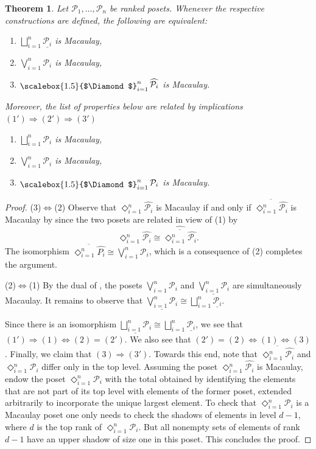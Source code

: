 \documentclass[11pt, reqno]{amsart}
\renewcommand{\P}{{\mathcal P}}
\theoremstyle{plain} %
\newtheorem{thm}{Theorem}[section]
\theoremstyle{definition}
\theoremstyle{remark}
\numberwithin{equation}{section}  %
\DeclareMathOperator{\dia}{\raisebox{-2pt}{\scalebox{1.5}{$\Diamond$}}}
\begin{document}
\begin{thm}
    \label{prop:equiv union wedge diamond}
Let $\P_1, \ldots, \P_n$ be ranked posets.   
 Whenever the respective constructions are defined, the following are equivalent:
\begin{enumerate}[itemsep=1mm]
    \item $\bigsqcup_{i=1}^n \underline{\P_i}$ is Macaulay, \
    \item $\bigvee_{i=1}^n \P_i$ is Macaulay, \
    \item $\dia_{i=1}^n \widehat{\P_i}$ is Macaulay.
\end{enumerate}
Moreover, the list of properties below are related by implications $(1')\Rightarrow (2')\Rightarrow (3')$
\begin{enumerate}
    \item[(1')] $\bigsqcup_{i=1}^n \P_i$ is Macaulay,
    \item[(2')] $\bigvee_{i=1}^n \P_i$ is Macaulay,
    \item[(3')] $\dia_{i=1}^n \P_i$ is Macaulay.
\end{enumerate}

\end{thm}
\begin{proof}
(3)$\Leftrightarrow$(2) Observe that $\Diamond_{i=1}^n \widehat{\P_i}$ is Macaulay if and only if  $\overline{\Diamond_{i=1}^n \widehat{\P_i}}$ is Macaulay by  since the two posets are related in view of  (1) by
\[
\Diamond_{i=1}^n \widehat{\P_i}\cong \widehat{\overline{\Diamond_{i=1}^n \widehat{\P_i}}}.
\] The isomorphism $\overline{\Diamond_{i=1}^n \widehat{P_i}} \cong \bigvee_{i=1}^n \P_i$, which is a consequence of  (2) completes the argument.

(2)$\Leftrightarrow$(1) By the dual of \Cref{prop: hat preserves Macaulay}, the posets $\bigvee_{i=1}^n \P_i$  and $\underline{\bigvee_{i=1}^n \P_i}$ are simultaneously  Macaulay.
It remains to observe that $\underline{\bigvee_{i=1}^n \P_i} \cong \bigsqcup_{i=1}^n \underline{\P_i}$.

Since there is an isomorphism $\underline{\bigsqcup_{i=1}^n \P_i}\cong  \bigsqcup_{i=1}^n \underline{\P_i}$, we see that $(1')\Rightarrow(1)\Leftrightarrow (2)=(2')$.
We also see that $(2')=(2)\Leftrightarrow(1)\Leftrightarrow (3)$. Finally, we claim that $(3)\Rightarrow (3')$. Towards this end, note that $\overline{\Diamond_{i=1}^n \widehat{\P_i}}$ and $\Diamond_{i=1}^n \P_i$ differ only in the top level. Assuming the poset $\Diamond_{i=1}^n \widehat{\P_i}$ is Macaulay, endow the poset $\Diamond_{i=1}^n \P_i$ with the total obtained by identifying the elements that are not part of its top level with elements of the former poset, extended arbitrarily to incorporate the unique largest element. To check that $\Diamond_{i=1}^n \P_i$ is a Macaulay poset one only needs to check the shadows of elements in level $d-1$, where $d$ is the top rank  of $\Diamond_{i=1}^n \P_i$. But all nonempty sets of elements of rank $d-1$ have an upper shadow of size one in this poset. This concludes the proof.
\end{proof}
\end{document}
